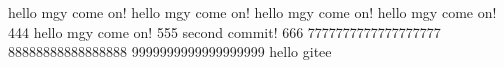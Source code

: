 hello mgy  come on!
hello mgy  come on!
hello mgy  come on!
hello mgy  come on! 444
hello mgy  come on! 555
second commit!  666
7777777777777777777
88888888888888888
9999999999999999999
hello gitee
